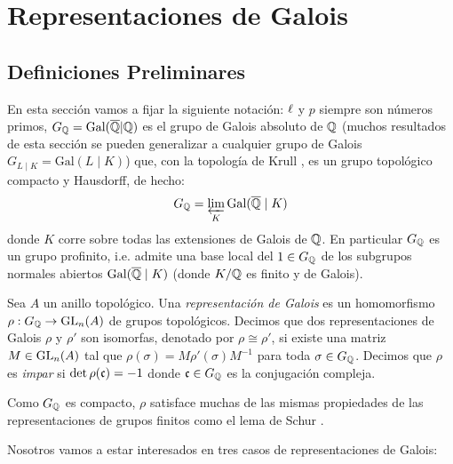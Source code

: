 \section{Representaciones de Galois}\label{sec:rep_galois}

\subsection{Definiciones Preliminares}%

En esta secci\'on vamos a fijar la siguiente notaci\'on: $\ell$ y $p$ siempre son n\'umeros primos, $G_{\mathbb{Q}}=\text{Gal}(\overline{\mathbb{Q}}|\mathbb{Q})$ es el grupo de Galois absoluto de $\mathbb{Q}$ (muchos resultados de esta secci\'on se pueden generalizar a cualquier grupo de Galois $G_{L\mid K}=\text{Gal}(L\mid K)$) que, con la topolog\'ia de Krull \cite[cap\'itulo IV, \S1]{NeukirchANT}, es un grupo topol\'ogico compacto y Hausdorff, de hecho:
\[
  G_{\mathbb{Q}}=\varprojlim_{K}\text{Gal}(\overline{\mathbb{Q}}\mid K)
\]
donde $K$ corre sobre todas las extensiones de Galois de $\mathbb{Q}$. En particular $G_{\mathbb{Q}}$ es un grupo profinito, i.e. admite una base local del $1\in G_{\mathbb{Q}}$ de los subgrupos normales abiertos $\text{Gal}(\overline{\mathbb{Q}}\mid K)$ (donde $K/\mathbb{Q}$ es finito y de Galois).

\begin{defin}
  Sea $A$ un anillo topol\'ogico. Una \emph{representaci\'on de Galois} es un homomorfismo $\rho:G_{\mathbb{Q}}\rightarrow\mathrm{GL}_n(A)$ de grupos topol\'ogicos. Decimos que dos representaciones de Galois $\rho$ y $\rho'$ son isomorfas, denotado por $\rho\cong\rho'$, si existe una matriz $M\in\mathrm{GL}_n(A)$ tal que $\rho(\sigma)=M\rho'(\sigma)M^{-1}$ para toda $\sigma\in G_{\mathbb{Q}}$. Decimos que $\rho$ es \emph{impar} si $\det\rho(\mathfrak{c})=-1$ donde $\mathfrak{c}\in G_{\mathbb{Q}}$ es la conjugaci\'on compleja.
\end{defin}

\begin{nota}
  Como $G_{\mathbb{Q}}$ es compacto, $\rho$ satisface muchas de las mismas propiedades de las representaciones de grupos finitos como el lema de Schur \cite[parte I, \S4]{SerreLROFG}.
\end{nota}

Nosotros vamos a estar interesados en tres casos de representaciones de Galois:

